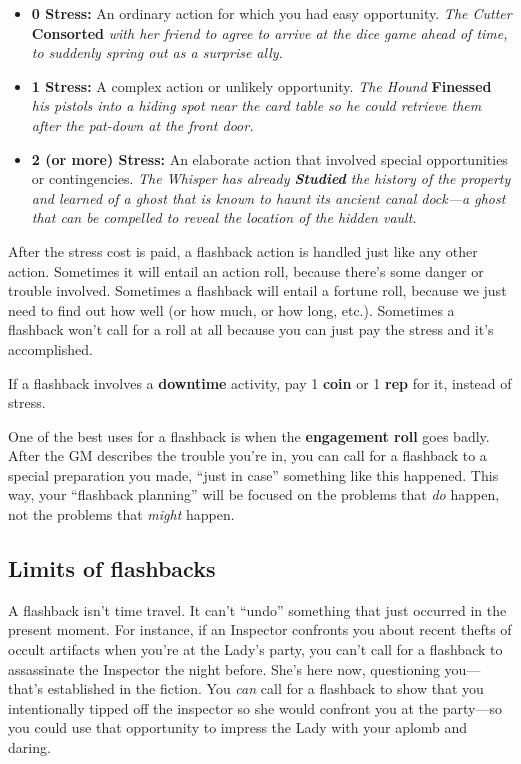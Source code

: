 \documentclass[11pt,oneside]{book}
\newcommand{\gameterm}[1]{\textbf{#1}}
\begin{document}
\begin{itemize}
	\item \gameterm{0 Stress:}  An ordinary action for which you had easy opportunity. \emph{The Cutter }\gameterm{Consorted} \emph{ with her friend to agree to arrive at the dice game ahead of time, to suddenly spring out as a surprise ally.}
	\item \gameterm{1 Stress:}  A complex action or unlikely opportunity. \emph{The Hound }\gameterm{Finessed} \emph{ his pistols into a hiding spot near the card table so he could retrieve them after the pat-down at the front door.}
	\item \gameterm{2 (or more) Stress:}  An elaborate action that involved special opportunities or contingencies. \emph{The Whisper has already \gameterm{Studied}  the history of the property and learned of a ghost that is known to haunt its ancient canal dock---a ghost that can be compelled to reveal the location of the hidden vault.}
\end{itemize}

After the stress cost is paid, a flashback action is handled just like any other action. Sometimes it will entail an action roll, because there’s some danger or trouble involved. Sometimes a flashback will entail a fortune roll, because we just need to find out how well (or how much, or how long, etc.). Sometimes a flashback won’t call for a roll at all because you can just pay the stress and it’s accomplished.

If a flashback involves a \textbf{downtime} activity, pay 1 \gameterm{coin}  or 1 \gameterm{rep}  for it, instead of stress.

One of the best uses for a flashback is when the \textbf{engagement roll} goes badly. After the GM describes the trouble you’re in, you can call for a flashback to a special preparation you made, “just in case” something like this happened. This way, your “flashback planning” will be focused on the problems that \emph{do }happen, not the problems that \emph{might} happen.

\subsection{Limits of flashbacks}

A flashback isn’t time travel. It can’t “undo” something that just occurred in the present moment. For instance, if an Inspector confronts you about recent thefts of occult artifacts when you’re at the Lady’s party, you can’t call for a flashback to assassinate the Inspector the night before. She’s here now, questioning you---that’s established in the fiction. You \emph{can} call for a flashback to show that you intentionally tipped off the inspector so she would confront you at the party---so you could use that opportunity to impress the Lady with your aplomb and daring.
\end{document}
